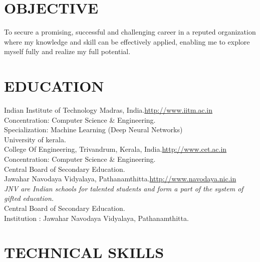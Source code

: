 \documentclass[11pt, a4paper, sans]{moderncv}
\begin{document}
\maketitle

\section{OBJECTIVE}
To secure a promising, successful and challenging career in a reputed organization where my knowledge and skill can be effectively applied, enabling me to explore myself fully and realize my full potential.\\


\section{EDUCATION}
{
Indian Institute of Technology Madras, India.\hfill \url{http://www.iitm.ac.in}\\
Concentration: Computer Science \& Engineering.\\
Specialization: Machine Learning (Deep Neural Networks)\\
}
{
University of kerala.\\
College Of Engineering, Trivandrum, Kerala, India.\hfill\url{http://www.cet.ac.in}\\
Concentration: Computer Science \& Engineering.\\
}
{
Central Board of Secondary Education.\\
Jawahar Navodaya Vidyalaya, Pathanamthitta.\hfill \url{http://www.navodaya.nic.in}\\
\textit{JNV are Indian schools for talented students and form a part of the system of gifted education.}\\
}
{
Central Board of Secondary Education.\\
Institution : Jawahar Navodaya Vidyalaya, Pathanamthitta. \\
}

\section{TECHNICAL SKILLS}
\end{document}
